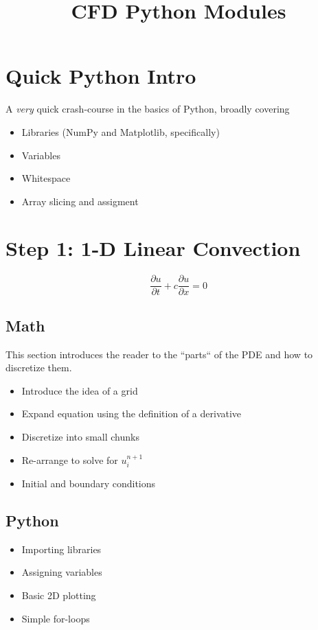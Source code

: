 \documentclass[10pt,a4paper]{report}
\title{CFD Python Modules}
\begin{document}
\section*{Quick Python Intro}
A \textit{very} quick crash-course in the basics of Python, broadly covering
\begin{itemize}
\item[] Libraries (NumPy and Matplotlib, specifically)
\item[] Variables
\item[] Whitespace
\item[]	Array slicing and assigment
\end{itemize}

\section*{Step 1: 1-D Linear Convection}

\begin{equation}
\frac{\partial u}{\partial t} + c \frac{\partial u}{\partial x} = 0
\end{equation}

\subsection*{Math}
This section introduces the reader to the ``parts`` of the PDE and how to discretize them.
\begin{itemize}
\item[] Introduce the idea of a grid
\item[] Expand equation using the definition of a derivative
\item[] Discretize into small chunks
\item[] Re-arrange to solve for $u^{n+1}_i$
\item[] Initial and boundary conditions
\end{itemize}

\subsection*{Python}
\begin{itemize}
\item[] Importing libraries
\item[] Assigning variables
\item[] Basic 2D plotting
\item[] Simple for-loops
\end{itemize}
\end{document}
